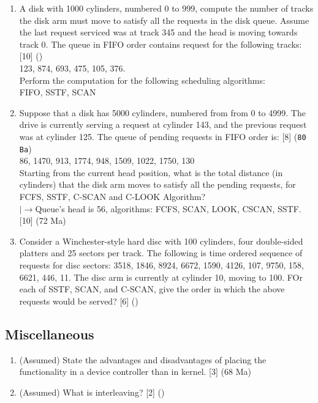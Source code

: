 \documentclass[12pt]{article}
\newcommand{\lb}{\\$\left|\rightarrow\right.$}
\begin{document}
\begin{enumerate}
			\item A disk with 1000 cylinders, numbered 0 to 999, compute the number of tracks the disk arm must move to satisfy all the requests in the disk queue. Assume the last request serviced was at track 345 and the head is moving towards track 0. The queue in FIFO order contains request for the following tracks: \hfill [10] ()\\
			123, 874, 693, 475, 105, 376.\\
			Perform the computation for the following scheduling algorithms:\\
			FIFO, SSTF, SCAN

			\item Suppose that a disk has 5000 cylinders, numbered from from 0 to 4999. The drive is currently serving a request at cylinder 143, and the previous request was at cylinder 125. The queue of pending requests in FIFO order is: \hfill [8] (\texttt{80 Ba})\\
			86, 1470, 913, 1774, 948, 1509, 1022, 1750, 130\\
			Starting from the current head position, what is the total distance (in cylinders) that the disk arm moves to satisfy all the pending requests, for FCFS, SSTF, C-SCAN and C-LOOK Algorithm?
			\lb Queue's head is 56, algorithms: FCFS, SCAN, LOOK, CSCAN, SSTF. \hfill [10] (72 Ma)

			\item Consider a Winchester-style hard disc with 100 cylinders, four double-sided platters and 25 sectors per track. The following is time ordered sequence of requests for disc sectors: {3518, 1846, 8924, 6672, 1590, 4126, 107, 9750, 158, 6621, 446, 11}. The disc arm is currently at cylinder 10, moving to 100. FOr each of SSTF, SCAN, and C-SCAN, give the order in which the above requests would be served? \hfill [6] ()
		\end{enumerate}
		
	\subsection{Miscellaneous}
		\begin{enumerate}[noitemsep, topsep=0pt]
			\item (Assumed) State the advantages and disadvantages of placing the functionality in a device controller than in kernel. \hfill [3] (68 Ma)

			\item (Assumed) What is interleaving? \hfill [2] ()
		\end{enumerate}
\end{document}

